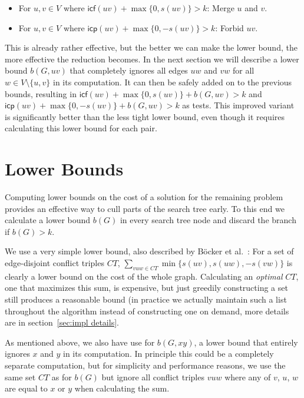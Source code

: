 \documentclass[12pt,oneside,english,parskip=full,headings=small]{scrbook}
\theoremstyle{definition}
\begin{document}
\begin{itemize}
	\item For $u, v \in V$ where $\mathsf{icf}(uv) + \max\{0, s(uv)\} > k$: Merge $u$ and $v$.
	\item For $u, v \in V$ where $\mathsf{icp}(uv) + \max\{0, -s(uv)\} > k$: Forbid $uv$.
\end{itemize}

This is already rather effective, but the better we can make the lower bound, the more effective the
reduction becomes. In the next section we will describe a lower bound $b(G, uv)$ that completely
ignores all edges $uw$ and $vw$ for all $w \in V \setminus \{u, v\}$ in its computation. It can then
be safely added on to the previous bounds, resulting in $\mathsf{icf}(uv) + \max\{0, s(uv)\} + b(G,
uv) > k$ and $\mathsf{icp}(uv) + \max\{0, -s(uv)\} + b(G, uv) > k$ as tests. This improved variant
is significantly better than the less tight lower bound, even though it requires calculating this
lower bound for each pair.

\section{Lower Bounds}

Computing lower bounds on the cost of a solution for the remaining problem provides an effective way
to cull parts of the search tree early. To this end we calculate a lower bound $b(G)$ in every
search tree node and discard the branch if $b(G) > k$.

We use a very simple lower bound, also described by Böcker et al.~\cite{ExactAlgos}: For a set of
edge-disjoint conflict triples $CT$, $\sum_{vuw \in CT} \min\{s(uv), s(uw), -s(vw)\}$ is clearly a
lower bound on the cost of the whole graph. Calculating an \emph{optimal} $CT$, one that maximizes
this sum, is expensive, but just greedily constructing a set still produces a reasonable bound (in
practice we actually maintain such a list throughout the algorithm instead of constructing one on
demand, more details are in section~\ref{sec:impl details}.

As mentioned above, we also have use for $b(G, xy)$, a lower bound that entirely ignores $x$ and $y$
in its computation. In principle this could be a completely separate computation, but for simplicity
and performance reasons, we use the same set $CT$ as for $b(G)$ but ignore all conflict triples $vuw$
where any of $v$, $u$, $w$ are equal to $x$ or $y$ when calculating the sum.
\end{document}
